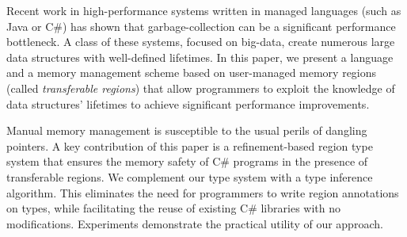 Recent work in high-performance systems written in managed languages
(such as Java or C\#) has shown that garbage-collection can be a
significant performance bottleneck.  A class of these systems, focused
on big-data, create numerous large data structures with well-defined
lifetimes.  In this paper, we present a language and a memory
management scheme based on user-managed memory regions (called
\emph{transferable regions}) that allow programmers to exploit the
knowledge of data structures' lifetimes to achieve significant
performance improvements.

Manual memory management is susceptible to the usual perils of
dangling pointers. A key contribution of this paper is a
refinement-based region type system that ensures the memory safety of
C\# programs in the presence of transferable regions. We complement
our type system with a type inference algorithm.
This eliminates the need for programmers to
write region annotations on types, while facilitating the reuse of
existing C\# libraries with no modifications. Experiments demonstrate
the practical utility of our approach.
